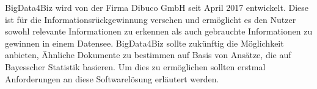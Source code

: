 BigData4Biz wird von der Firma Dibuco GmbH seit April 2017 entwickelt. Diese ist für die Informationsrückgewinnung versehen und ermöglicht es den Nutzer sowohl relevante Informationen zu erkennen als auch gebrauchte Informationen zu gewinnen in einem Datensee. BigData4Biz sollte zukünftig die Möglichkeit anbieten, Ähnliche Dokumente zu bestimmen auf Basis von Ansätze, die auf Bayesscher Statistik basieren. Um dies zu ermöglichen sollten erstmal Anforderungen an diese Softwarelösung erläutert werden.